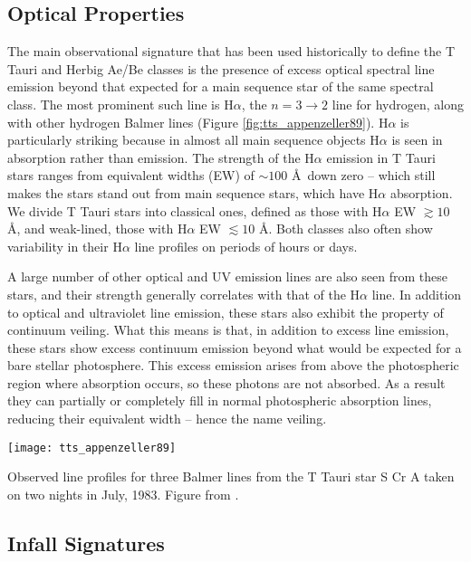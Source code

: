 \subsection{Optical Properties}

The main observational signature that has been used historically to define the T Tauri and Herbig Ae/Be classes is the presence of excess optical spectral line emission beyond that expected for a main sequence star of the same spectral class. The most prominent such line is H$\alpha$, the $n=3\rightarrow 2$ line for hydrogen, along with other hydrogen Balmer lines (Figure \ref{fig:tts_appenzeller89}). H$\alpha$ is particularly striking because in almost all main sequence objects H$\alpha$ is seen in absorption rather than emission. The strength of the H$\alpha$ emission in T Tauri stars ranges from equivalent widths (EW) of $\sim 100$ \AA\ down zero -- which still makes the stars stand out from main sequence stars, which have H$\alpha$ absorption. We divide T Tauri stars into classical ones, defined as those with H$\alpha$ EW $\gtrsim 10$ \AA, and weak-lined, those with H$\alpha$ EW $\lesssim 10$ \AA. Both classes also often show variability in their H$\alpha$ line profiles on periods of hours or days.

A large number of other optical and UV emission lines are also seen from these stars, and their strength generally correlates with that of the H$\alpha$ line. In addition to optical and ultraviolet line emission, these stars also exhibit the property of continuum veiling. What this means is that, in addition to excess line emission, these stars show excess continuum emission beyond what would be expected for a bare stellar photosphere. This excess emission arises from above the photospheric region where absorption occurs, so these photons are not absorbed. As a result they can partially or completely fill in normal photospheric absorption lines, reducing their equivalent width -- hence the name veiling.

\begin{marginfigure}
\texttt{[image: tts\_appenzeller89]}
\caption[Balmer lines of T Tauri stars]{
\label{fig:tts_appenzeller89}
Observed line profiles for three Balmer lines from the T Tauri star S Cr A taken on two nights in July, 1983. Figure from \citet{appenzeller89a}.
}
\end{marginfigure}

\subsection{Infall Signatures}

